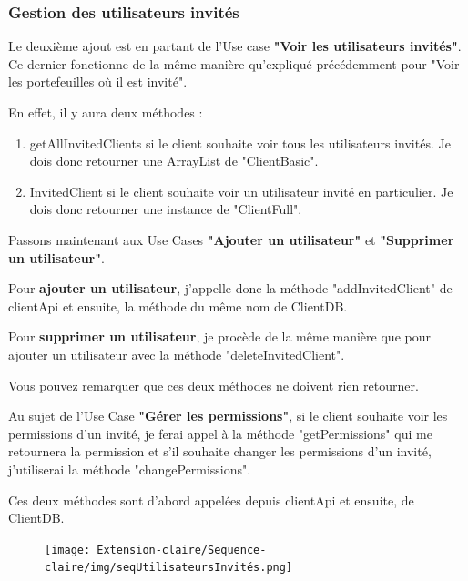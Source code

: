 \newpage

\subsubsection{Gestion des utilisateurs invités}
\begin{flushleft}
Le deuxième ajout est en partant de l'Use case \textbf{"Voir les utilisateurs invités"}. Ce dernier fonctionne de la même manière qu'expliqué précédemment pour "Voir les portefeuilles où il est invité".
\end{flushleft}
\begin{flushleft}
En effet, il y aura deux méthodes : 
\end{flushleft}
\begin{enumerate}
\item getAllInvitedClients si le client souhaite voir tous les utilisateurs invités. Je dois donc retourner une ArrayList de "ClientBasic".
\item InvitedClient si le client souhaite voir un utilisateur invité en particulier. Je dois donc retourner une instance de "ClientFull".
\end{enumerate}

\begin{flushleft}
Passons maintenant aux Use Cases \textbf{"Ajouter un utilisateur"} et \textbf{"Supprimer un utilisateur"}.
\end{flushleft}

\begin{flushleft}
Pour \textbf{ajouter un utilisateur}, j'appelle donc la méthode "addInvitedClient" de clientApi et ensuite, la méthode du même nom de ClientDB.
\end{flushleft}

\begin{flushleft}
Pour \textbf{supprimer un utilisateur}, je procède de la même manière que pour ajouter un utilisateur avec la méthode "deleteInvitedClient".
\end{flushleft}

\begin{flushleft}
Vous pouvez remarquer que ces deux méthodes ne doivent rien retourner.
\end{flushleft}

\begin{flushleft}
Au sujet de l'Use Case \textbf{"Gérer les permissions"}, si le client souhaite voir les permissions d'un invité, je ferai appel à la méthode "getPermissions" qui me retournera la permission et s'il souhaite changer les permissions d'un invité, j'utiliserai la méthode "changePermissions".
\end{flushleft}

\begin{flushleft}
Ces deux méthodes sont d'abord appelées depuis clientApi et ensuite, de ClientDB.
\end{flushleft}

\newpage
\begin{figure}[h]
\centering
\texttt{[image: Extension-claire/Sequence-claire/img/seqUtilisateursInvités.png]}
\end{figure}